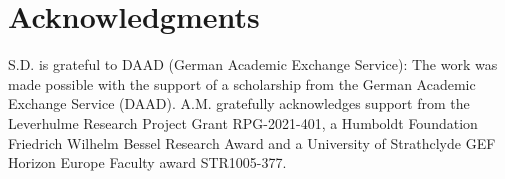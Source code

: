 \documentclass{article}
\begin{document}
\section*{Acknowledgments}
S.D. is grateful to DAAD (German Academic Exchange Service): The work was made possible with the support of a scholarship from
the German Academic Exchange Service (DAAD). A.M. gratefully acknowledges support from the Leverhulme Research Project Grant RPG-2021-401, a Humboldt Foundation Friedrich Wilhelm Bessel Research Award and a University of Strathclyde GEF Horizon Europe Faculty award STR1005-377.

\end{document}
